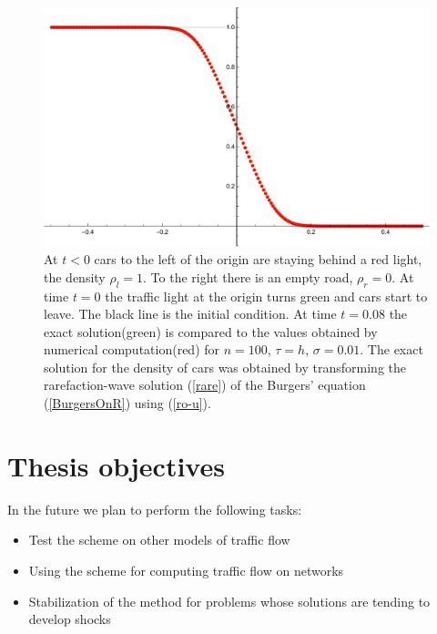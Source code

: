 \documentclass[a4paper,12pt,twoside]{report}%
\begin{document}
\begin{figure}[h!]
	\centering
	\includegraphics[width=\textwidth]{figures/trafficRare1}
	\caption{At $ t<0 $ cars to the left of the origin are staying behind a red light, the density $ \rho_l = 1 $. To the right there is an empty road, $ \rho_r = 0 $. At time $ t = 0 $ the traffic light at the origin turns green and cars start to leave. The black line is the initial condition. At time $ t = 0.08 $ the exact solution(green) is compared to the values obtained by numerical computation(red) for $ n = 100 $, $ \tau = h $, $ \sigma = 0.01 $. The exact solution for the density of cars was obtained by transforming the rarefaction-wave solution {\rm (\ref{rare})} of the Burgers' equation {\rm (\ref{BurgersOnR})} using {\rm (\ref{ro-u})}.}
	\label{fig:traffic_rare}
\end{figure}

\chapter{Thesis objectives}
In the future we plan to perform the following tasks:
\begin{itemize}
	\item Test the scheme on other models of traffic flow
	\item Using the scheme for computing traffic flow on networks
	\item Stabilization of the method for problems whose solutions are tending to develop shocks
\end{itemize}
\end{document}
